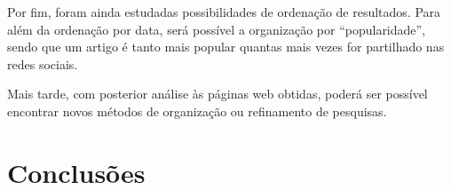 \documentclass[twocolumn,twoside,10pt,a4paper]{article}
\begin{document}
Por fim, foram ainda estudadas possibilidades de ordenação de resultados. Para além da ordenação por data, será possível a organização por “popularidade”, sendo que um artigo é tanto mais popular quantas mais vezes for partilhado nas redes sociais. 

Mais tarde, com posterior análise às páginas web obtidas, poderá ser possível encontrar novos métodos de organização ou refinamento de pesquisas.

\section{Conclusões}\label{sec:conclude}



\end{document}
